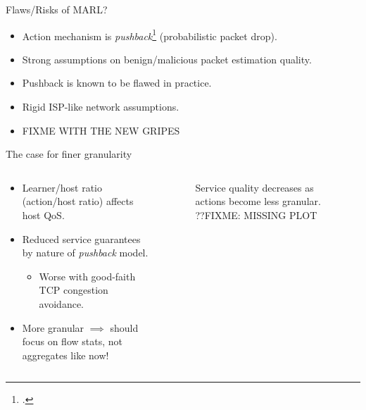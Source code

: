 \documentclass[aspectratio=169,xcolor={dvipsnames}
,hide notes
]{beamer}
\begin{document}
\begin{frame}{Flaws/Risks of MARL?}	
	\begin{itemize}		
		\item Action mechanism is \emph{pushback}\footcite{DBLP:journals/ccr/MahajanBFIPS02a} (probabilistic packet drop).
		
		\item Strong assumptions on benign/malicious packet estimation quality. 
		\item Pushback is known to be flawed in practice.
		\item Rigid ISP-like network assumptions.
		
		\item FIXME WITH THE NEW GRIPES
	\end{itemize}
\end{frame}

\begin{frame}{The case for finer granularity}
	\begin{columns}
	\begin{column}{0.45\linewidth}
		\begin{itemize}
			\item Learner/host ratio (action/host ratio) affects host QoS.
			
			\item Reduced service guarantees by nature of \emph{pushback} model.
			\begin{itemize}
				\item \alert{Worse with good-faith TCP congestion avoidance}.
			\end{itemize}
			
			\item More granular $\implies$ should focus on flow stats, \alert{not aggregates} like now! %
		\end{itemize}
	\end{column}
	\begin{column}{0.5\linewidth}
		\begin{figure}
			\caption{Service quality decreases as actions become less granular. ??FIXME: MISSING PLOT}
		\end{figure}
	\end{column}
	\end{columns}
\end{frame}
\end{document}
